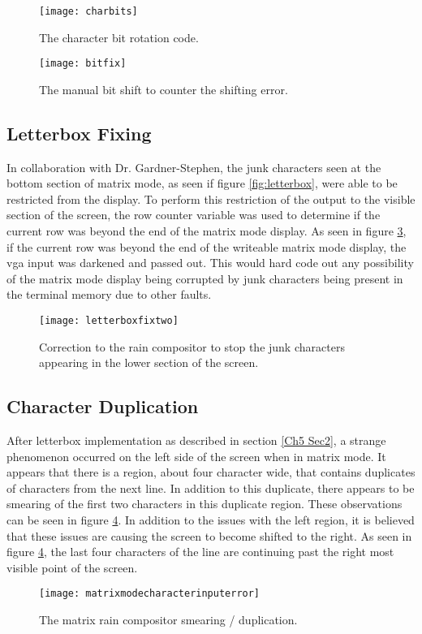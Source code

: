 \begin{figure}
  \centering
  \texttt{[image: charbits]}
  \caption{The character bit rotation code.}
  \label{fig:charbits}
\end{figure}

\begin{figure}
  \centering
  \texttt{[image: bitfix]}
  \caption{The manual bit shift to counter the shifting error.}
  \label{fig:bitfix}
\end{figure}


\subsection{Letterbox Fixing}

\label{Ch5 Sec3 Sub4}

In collaboration with Dr. Gardner-Stephen, the junk characters seen at the bottom section of matrix mode, as seen if figure \ref{fig:letterbox}, were able to be restricted from the display. To perform this restriction of the output to the visible section of the screen, the row counter variable was used to determine if the current row was beyond the end of the matrix mode display. As seen in figure \ref{fig:letterboxfixtwo}, if the current row was beyond the end of the writeable matrix mode display, the vga input was darkened and passed out. This would hard code out any possibility of the matrix mode display being corrupted by junk characters being present in the terminal memory due to other faults.

\begin{figure}
  \centering
  \texttt{[image: letterboxfixtwo]}
  \caption{Correction to the rain compositor to stop the junk characters appearing in the lower section of the screen.}
  \label{fig:letterboxfixtwo}
\end{figure}


\subsection{Character Duplication}

\label{Ch5 Sec3 Sub5}

After letterbox implementation as described in section \ref{Ch5 Sec2}, a strange phenomenon occurred on the left side of the screen when in matrix mode. It appears that there is a region, about four character wide, that contains duplicates of characters from the next line. In addition to this duplicate, there appears to be smearing of the first two characters in this duplicate region. These observations can be seen in figure \ref{fig:matrixmodecharacterinputerror}. In addition to the issues with the left region, it is believed that these issues are causing the screen to become shifted to the right. As seen in figure \ref{fig:matrixmodecharacterinputerror}, the last four characters of the line are continuing past the right most visible point of the screen. 

\begin{figure}
  \centering
  \texttt{[image: matrixmodecharacterinputerror]}
  \caption{The matrix rain compositor smearing / duplication.}
  \label{fig:matrixmodecharacterinputerror}
\end{figure}
